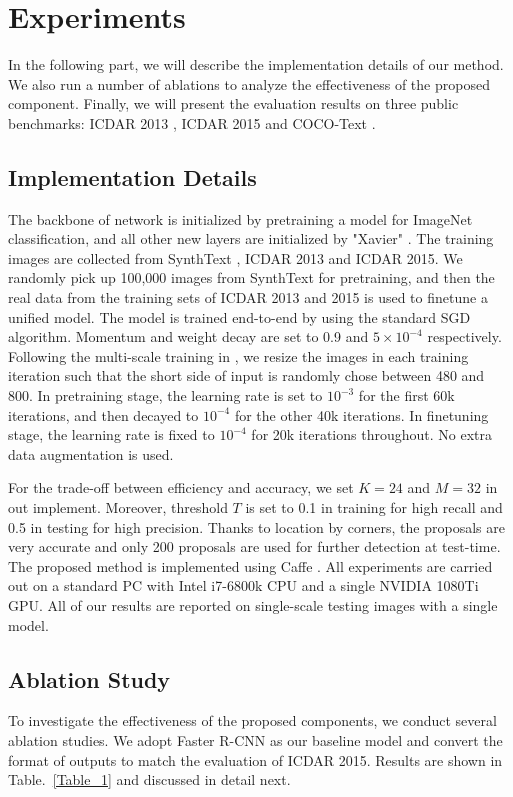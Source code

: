 \documentclass[3p, times]{elsarticle}
\begin{document}
\section{Experiments}
In the following part, we will describe the implementation details of our method. We also run a number of ablations to analyze the effectiveness of the proposed component. Finally, we will present the evaluation results on three public benchmarks: ICDAR 2013 \cite{ICDAR2013}, ICDAR 2015 \cite{ICDAR2015} and COCO-Text \cite{COCO2016ARXIV}.



\subsection{Implementation Details}
The backbone of network is initialized by pretraining a model for ImageNet \cite{IMAGENET2015IJCV} classification, and all other new layers are initialized by "Xavier" \cite{XAVIER2010AISTATS}. The training images are collected from SynthText \cite{FCRN2016CVPR}, ICDAR 2013 and ICDAR 2015. We randomly pick up 100,000 images from SynthText for pretraining, and then the real data from the training sets of ICDAR 2013 and 2015 is used to finetune a unified model. The model is trained end-to-end by using the standard SGD algorithm. Momentum and weight decay are set to 0.9 and $5\times10^{-4}$  respectively. Following the multi-scale training in \cite{PVANET2016ARXIV}, we resize the images in each training iteration such that the short side of input is randomly chose between 480 and 800. In pretraining stage, the learning rate is set to $10^{-3}$ for the first 60k iterations, and then decayed to $10^{-4}$ for the other 40k iterations. In finetuning stage, the learning rate is fixed to $10^{-4}$ for 20k iterations throughout. No extra data augmentation is used.

For the trade-off between efficiency and accuracy, we set $K=24$ and $M=32$ in out implement. Moreover, threshold $T$ is set to 0.1 in training for high recall and 0.5 in testing for high precision. Thanks to location by corners, the proposals are very accurate and only 200 proposals are used for further detection at test-time. The proposed method is implemented using Caffe \cite{CAFFE2014ACM}. All experiments are carried out on a standard PC with Intel i7-6800k CPU and a single NVIDIA 1080Ti GPU. All of our results are reported on single-scale testing images with a single model.



\subsection{Ablation Study}
To investigate the effectiveness of the proposed components, we conduct several ablation studies. We adopt Faster R-CNN \cite{FASTERRCNN2015NIPS} as our baseline model and convert the format of outputs to match the evaluation of ICDAR 2015. Results are shown in Table.~\ref{Table_1} and discussed in detail next. 
\end{document}
